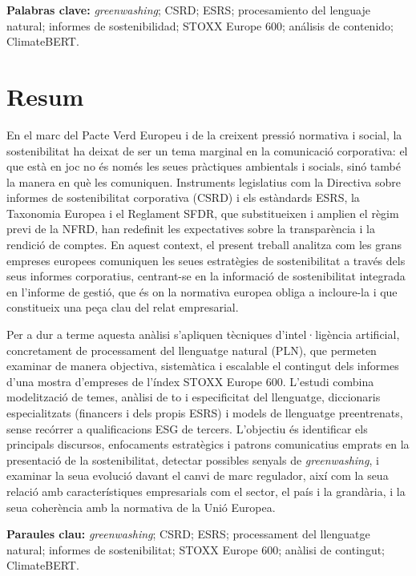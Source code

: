 \medskip
\noindent\textbf{Palabras clave:} \textit{greenwashing}; CSRD; ESRS; procesamiento del lenguaje
natural; informes de sostenibilidad; STOXX Europe 600; análisis de contenido; ClimateBERT.

\section*{Resum}

En el marc del Pacte Verd Europeu i de la creixent pressió normativa i social, la sostenibilitat
ha deixat de ser un tema marginal en la comunicació corporativa: el que està en joc no és només
les seues pràctiques ambientals i socials, sinó també la manera en què les comuniquen.
Instruments legislatius com la Directiva sobre informes de sostenibilitat corporativa (CSRD) i
els estàndards ESRS, la Taxonomia Europea i el Reglament SFDR, que substitueixen i amplien el
règim previ de la NFRD, han redefinit les expectatives sobre la transparència i la rendició de
comptes. En aquest context, el present treball analitza com les grans empreses europees
comuniquen les seues estratègies de sostenibilitat a través dels seus informes corporatius,
centrant-se en la informació de sostenibilitat integrada en l'informe de gestió, que és on la
normativa europea obliga a incloure-la i que constitueix una peça clau del relat empresarial.

Per a dur a terme aquesta anàlisi s'apliquen tècniques d'intel·ligència artificial, concretament
de processament del llenguatge natural (PLN), que permeten examinar de manera objectiva,
sistemàtica i escalable el contingut dels informes d'una mostra d'empreses de l'índex STOXX
Europe 600. L'estudi combina modelització de temes, anàlisi de to i especificitat del llenguatge,
diccionaris especialitzats (financers i dels propis ESRS) i models de llenguatge preentrenats,
sense recórrer a qualificacions ESG de tercers. L'objectiu és identificar els principals
discursos, enfocaments estratègics i patrons comunicatius emprats en la presentació de la
sostenibilitat, detectar possibles senyals de \textit{greenwashing}, i examinar la seua evolució
davant el canvi de marc regulador, així com la seua relació amb característiques empresarials com
el sector, el país i la grandària, i la seua coherència amb la normativa de la Unió Europea.

\medskip
\noindent\textbf{Paraules clau:} \textit{greenwashing}; CSRD; ESRS; processament del llenguatge
natural; informes de sostenibilitat; STOXX Europe 600; anàlisi de contingut; ClimateBERT.

